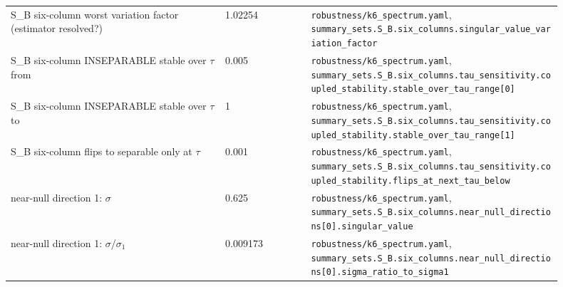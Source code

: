 \begin{longtable}{p{0.35\linewidth} p{0.14\linewidth} p{0.41\linewidth}}
S\_B six-column worst variation factor (estimator resolved?) & 1.02254 & \texttt{\footnotesize robustness/k6\_\allowbreak{}spectrum.\allowbreak{}yaml}, \texttt{\footnotesize summary\_\allowbreak{}sets.\allowbreak{}S\_\allowbreak{}B.\allowbreak{}six\_\allowbreak{}columns.\allowbreak{}singular\_\allowbreak{}value\_\allowbreak{}variation\_\allowbreak{}factor} \\
S\_B six-column INSEPARABLE stable over $\tau$ from & 0.005 & \texttt{\footnotesize robustness/k6\_\allowbreak{}spectrum.\allowbreak{}yaml}, \texttt{\footnotesize summary\_\allowbreak{}sets.\allowbreak{}S\_\allowbreak{}B.\allowbreak{}six\_\allowbreak{}columns.\allowbreak{}tau\_\allowbreak{}sensitivity.\allowbreak{}coupled\_\allowbreak{}stability.\allowbreak{}stable\_\allowbreak{}over\_\allowbreak{}tau\_\allowbreak{}range[0]} \\
S\_B six-column INSEPARABLE stable over $\tau$ to & 1 & \texttt{\footnotesize robustness/k6\_\allowbreak{}spectrum.\allowbreak{}yaml}, \texttt{\footnotesize summary\_\allowbreak{}sets.\allowbreak{}S\_\allowbreak{}B.\allowbreak{}six\_\allowbreak{}columns.\allowbreak{}tau\_\allowbreak{}sensitivity.\allowbreak{}coupled\_\allowbreak{}stability.\allowbreak{}stable\_\allowbreak{}over\_\allowbreak{}tau\_\allowbreak{}range[1]} \\
S\_B six-column flips to separable only at $\tau$ & 0.001 & \texttt{\footnotesize robustness/k6\_\allowbreak{}spectrum.\allowbreak{}yaml}, \texttt{\footnotesize summary\_\allowbreak{}sets.\allowbreak{}S\_\allowbreak{}B.\allowbreak{}six\_\allowbreak{}columns.\allowbreak{}tau\_\allowbreak{}sensitivity.\allowbreak{}coupled\_\allowbreak{}stability.\allowbreak{}flips\_\allowbreak{}at\_\allowbreak{}next\_\allowbreak{}tau\_\allowbreak{}below} \\
near-null direction 1: $\sigma$ & 0.625 & \texttt{\footnotesize robustness/k6\_\allowbreak{}spectrum.\allowbreak{}yaml}, \texttt{\footnotesize summary\_\allowbreak{}sets.\allowbreak{}S\_\allowbreak{}B.\allowbreak{}six\_\allowbreak{}columns.\allowbreak{}near\_\allowbreak{}null\_\allowbreak{}directions[0].\allowbreak{}singular\_\allowbreak{}value} \\
near-null direction 1: $\sigma$/$\sigma_1$ & 0.009173 & \texttt{\footnotesize robustness/k6\_\allowbreak{}spectrum.\allowbreak{}yaml}, \texttt{\footnotesize summary\_\allowbreak{}sets.\allowbreak{}S\_\allowbreak{}B.\allowbreak{}six\_\allowbreak{}columns.\allowbreak{}near\_\allowbreak{}null\_\allowbreak{}directions[0].\allowbreak{}sigma\_\allowbreak{}ratio\_\allowbreak{}to\_\allowbreak{}sigma1} \\

\end{longtable}
